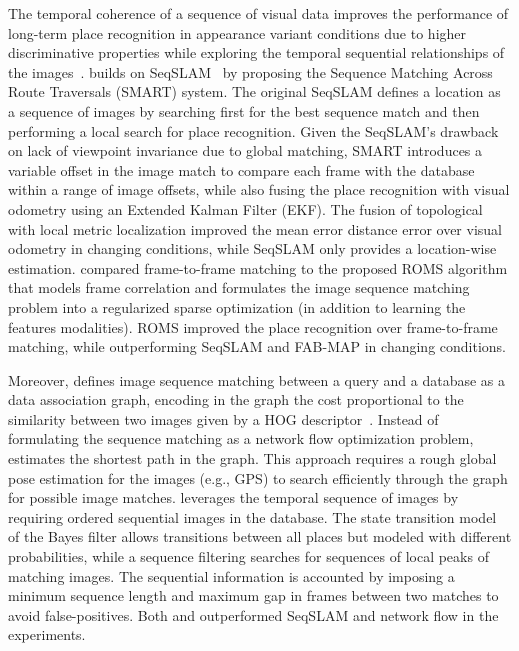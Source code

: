 The temporal coherence of a sequence of visual data improves the performance of long-term place recognition in appearance variant conditions due to higher discriminative properties while exploring the temporal sequential relationships of the images~\parencite{ouerghi-et-al:2018:s18040939,nguyen-et-al:2013:004}.
\cite{ouerghi-et-al:2018:s18040939} builds on SeqSLAM~\parencite{discussion:seqslam} by proposing the Sequence Matching Across Route Traversals (SMART) system. The original SeqSLAM defines a location as a sequence of images by searching first for the best sequence match and then performing a local search for place recognition. Given the SeqSLAM's drawback on lack of viewpoint invariance due to global matching, SMART introduces a variable offset in the image match to compare each frame with the database within a range of image offsets, while also fusing the place recognition with visual odometry using an Extended Kalman Filter (EKF). The fusion of topological with local metric localization improved the mean error distance error over visual odometry in changing conditions, while SeqSLAM only provides a location-wise estimation.
\cite{han-et-al:2018:3} compared frame-to-frame matching to the proposed ROMS algorithm that models frame correlation and formulates the image sequence matching problem into a regularized sparse optimization (in addition to learning the features modalities). ROMS improved the place recognition over frame-to-frame matching, while outperforming SeqSLAM and FAB-MAP in changing conditions.

Moreover, \cite{vysotska-et-al:2015:7139576} defines image sequence matching between a query and a database as a data association graph, encoding in the graph the cost proportional to the similarity between two images given by a HOG descriptor~\parencite{naseer-et-al:2015:7324181}. Instead of formulating the sequence matching as a network flow optimization problem, \cite{vysotska-et-al:2015:7139576} estimates the shortest path in the graph. This approach requires a rough global pose estimation for the images (e.g., GPS) to search efficiently through the graph for possible image matches.
\cite{naseer-et-al:2015:7324181} leverages the temporal sequence of images by requiring ordered sequential images in the database. The state transition model of the Bayes filter allows transitions between all places but modeled with different probabilities, while a sequence filtering searches for sequences of local peaks of matching images. The sequential information is accounted by imposing a minimum sequence length and maximum gap in frames between two matches to avoid false-positives.
Both \cite{vysotska-et-al:2015:7139576} and \cite{naseer-et-al:2015:7324181} outperformed SeqSLAM and network flow in the experiments.

